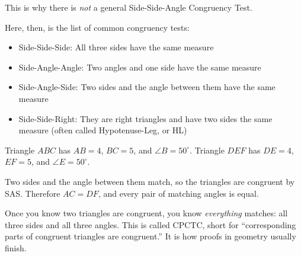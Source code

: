 
This is why there is \emph{not} a general Side-Side-Angle Congruency Test.

Here, then, is the list of common congruency tests:
\begin{itemize}
\item Side-Side-Side: All three sides have the same measure
\item Side-Angle-Angle: Two angles and one side have the same measure
\item Side-Angle-Side: Two sides and the angle between them have the same measure
\item Side-Side-Right: They are right triangles and have two sides the same measure (often called Hypotenuse-Leg, or HL)
\end{itemize}

\begin{Worked}
\begin{Problem}
Triangle $ABC$ has $AB = 4$, $BC = 5$, and $\angle B = 50^\circ$. Triangle $DEF$ has $DE = 4$, $EF = 5$, and $\angle E = 50^\circ$.
\end{Problem}
\begin{Solution}
Two sides and the angle between them match, so the triangles are congruent by SAS. Therefore $AC = DF$, and every pair of matching angles is equal.
\end{Solution}
\end{Worked}

Once you know two triangles are congruent, you know \emph{everything} matches: all three sides and all three angles. This is called CPCTC, short for ``corresponding parts of congruent triangles are congruent.'' It is how proofs in geometry usually finish.



